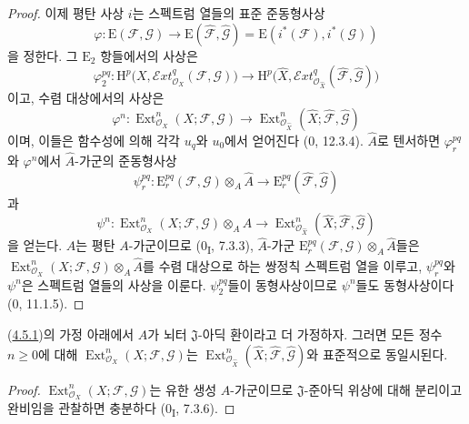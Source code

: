 \begin{proof}
이제 평탄 사상 $i$는 스펙트럼 열들의 표준 준동형사상
\[
\varphi:\mathrm E(\mathcal F,\mathcal G)\longrightarrow
\mathrm E(\widehat{\mathcal F},\widehat{\mathcal G})
=\mathrm E(i^*(\mathcal F),i^*(\mathcal G))
\]
을 정한다. 그 $\mathrm E_2$ 항들에서의 사상은
\[
\varphi_2^{pq}:\mathrm H^p\bigl(X,
\mathcal{E}\!xt^q_{\mathcal O_X}(\mathcal F,\mathcal G)\bigr)
\longrightarrow
\mathrm H^p\bigl(\widehat X,
\mathcal{E}\!xt^q_{\mathcal O_{\widehat X}}
(\widehat{\mathcal F},\widehat{\mathcal G})\bigr)
\]
이고, 수렴 대상에서의 사상은
\[
\varphi^n:\operatorname{Ext}^n_{\mathcal O_X}
(X;\mathcal F,\mathcal G)\longrightarrow
\operatorname{Ext}^n_{\mathcal O_{\widehat X}}
(\widehat X;\widehat{\mathcal F},\widehat{\mathcal G})
\]
이며, 이들은 함수성에 의해 각각 $u_q$와 $u_0$에서 얻어진다
(0, 12.3.4). $\widehat A$로 텐서하면 $\varphi_r^{pq}$와
$\varphi^n$에서 $\widehat A$-가군의 준동형사상
\[
\psi_r^{pq}:\mathrm E_r^{pq}(\mathcal F,\mathcal G)
\otimes_A\widehat A\longrightarrow
\mathrm E_r^{pq}(\widehat{\mathcal F},\widehat{\mathcal G})
\]
과
\[
\psi^n:\operatorname{Ext}^n_{\mathcal O_X}(X;\mathcal F,\mathcal G)
\otimes_A\widehat A\longrightarrow
\operatorname{Ext}^n_{\mathcal O_{\widehat X}}
(\widehat X;\widehat{\mathcal F},\widehat{\mathcal G})
\]
을 얻는다. $\widehat A$는 평탄 $A$-가군이므로
(0\textsubscript{I}, 7.3.3), $\widehat A$-가군
$\mathrm E_r^{pq}(\mathcal F,\mathcal G)\otimes_A\widehat A$들은
$\operatorname{Ext}^n_{\mathcal O_X}(X;\mathcal F,\mathcal G)
\otimes_A\widehat A$를 수렴 대상으로 하는 쌍정칙 스펙트럼 열을
이루고, $\psi_r^{pq}$와 $\psi^n$은 스펙트럼 열들의 사상을 이룬다.
$\psi_2^{pq}$들이 동형사상이므로 $\psi^n$들도 동형사상이다
(0, 11.1.5).
\end{proof}

\begin{corollary}[4.5.2]
\label{III.4.5.2-fr}
(\hyperref[III.4.5.1-fr]{4.5.1})의 가정 아래에서 $A$가 뇌터
$\mathfrak J$-아딕 환이라고 더 가정하자. 그러면 모든 정수
$n\geq0$에 대해
$\operatorname{Ext}^n_{\mathcal O_X}(X;\mathcal F,\mathcal G)$는
$\operatorname{Ext}^n_{\mathcal O_{\widehat X}}
(\widehat X;\widehat{\mathcal F},\widehat{\mathcal G})$와 표준적으로
동일시된다.
\end{corollary}

\begin{proof}
$\operatorname{Ext}^n_{\mathcal O_X}(X;\mathcal F,\mathcal G)$는 유한 생성
$A$-가군이므로 $\mathfrak J$-준아딕 위상에 대해 분리이고 완비임을
관찰하면 충분하다 (0\textsubscript{I}, 7.3.6).
\end{proof}

